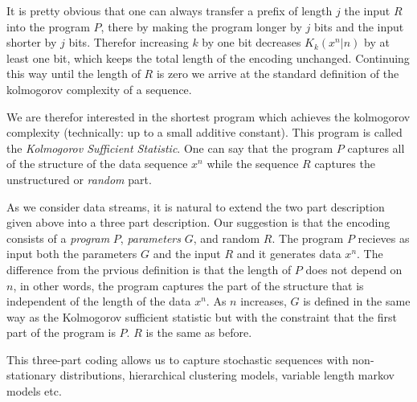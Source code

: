 \documentclass[11pt]{article}
\begin{document}
It is pretty obvious that one can always transfer a prefix of length
$j$ the input $R$ into the program $P$, there by making the program
longer by $j$ bits and the input shorter by $j$ bits. Therefor
increasing $k$ by one bit decreases  $K_k(x^n|n)$ by at least one bit,
which keeps the total length of the encoding unchanged. Continuing
this way until the length of $R$ is zero we arrive at the standard
definition of the kolmogorov complexity of a sequence.

We are therefor interested in the shortest program which achieves the
kolmogorov complexity (technically: up to a small additive constant).
This program is called the {\em Kolmogorov Sufficient Statistic}. One
can say that the program $P$ captures all of the structure of the data
sequence $x^n$ while the sequence $R$ captures the unstructured or
{\em random} part.

As we consider data streams, it is natural to extend the two part
description given above into a three part description. Our suggestion
is that the encoding consists of a {\em program} $P$, {\em parameters}
$G$, and random $R$. The program $P$ recieves as input both the
parameters $G$ and the input $R$ and it generates data $x^n$. The
difference from the prvious definition is that the length of $P$ does
not depend on $n$, in other words, the program captures the part of
the structure that is independent of the length of the data $x^n$. As
$n$ increases, $G$ is defined in the same way as the Kolmogorov
sufficient statistic but with the constraint that the first part of
the program is $P$. $R$ is the same as before.

This three-part coding allows us to capture stochastic sequences with
non-stationary distributions, hierarchical clustering models, variable
length markov models etc.
\end{document}
